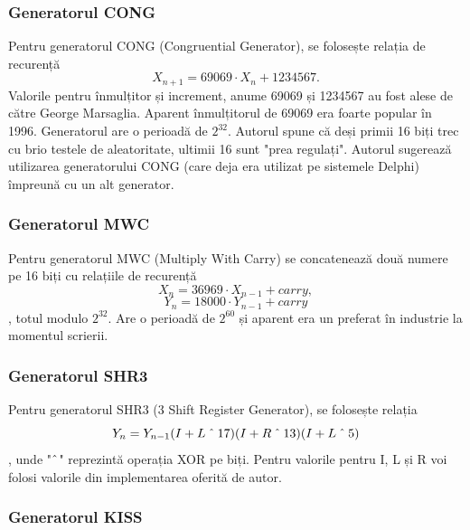 \subsubsection{Generatorul CONG}

Pentru generatorul CONG (Congruential Generator), se folosește relația de recurență
\[
X_{n+1} = 69069 \cdot X_{n} + 1234567.
\]
Valorile pentru înmulțitor și increment, anume 69069 și 1234567 au fost alese de către George Marsaglia. Aparent înmulțitorul de 69069 era foarte popular în 1996. Generatorul are o perioadă de $2^{32}$. Autorul spune că deși primii 16 biți trec cu brio testele de aleatoritate, ultimii 16 sunt "prea regulați". Autorul sugerează utilizarea generatorului CONG (care deja era utilizat pe sistemele Delphi) împreună cu un alt generator.

\subsubsection{Generatorul MWC}

Pentru generatorul MWC (Multiply With Carry) se concatenează două numere pe 16 biți cu relațiile de recurență
\[
X_n = 36969 \cdot X_{n-1} + carry, 
\]
\[
Y_n = 18000 \cdot Y_{n-1} + carry
\],
totul modulo $2^{32}$. Are o perioadă de $2^{60}$ și aparent era un preferat în industrie la momentul scrierii.

\subsubsection{Generatorul SHR3}

Pentru generatorul SHR3 (3 Shift Register Generator), se folosește relația 
\[
Y_n = Y_{n-1} (I + L \XOR 17) (I + R \XOR 13) (I + L \XOR 5) 
\]
, unde "$\XOR$" reprezintă operația XOR pe biți. Pentru valorile pentru I, L și R voi folosi valorile din implementarea oferită de autor.

\subsubsection{Generatorul KISS}

